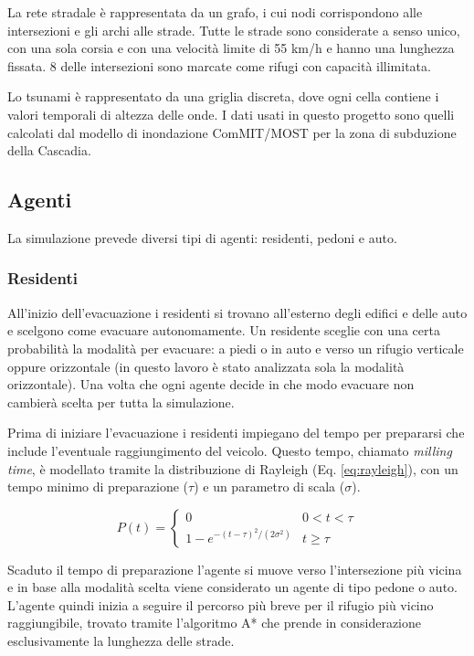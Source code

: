 La rete stradale è rappresentata da un grafo, i cui nodi corrispondono alle intersezioni e gli archi alle strade.
Tutte le strade sono considerate a senso unico, con una sola corsia e con una velocità limite di 55 km/h e hanno una lunghezza fissata.
8 delle intersezioni sono marcate come rifugi con capacità illimitata.

Lo tsunami è rappresentato da una griglia discreta, dove ogni cella contiene i valori temporali di altezza delle onde.
I dati usati in questo progetto sono quelli calcolati dal modello di inondazione ComMIT/MOST \parencite{titov1997implementation} per la zona di subduzione della Cascadia.

\pagebreak

\subsection{Agenti}
La simulazione prevede diversi tipi di agenti: residenti, pedoni e auto.

\subsubsection{Residenti}
All'inizio dell'evacuazione i residenti si trovano all'esterno degli edifici e delle auto
e scelgono come evacuare autonomamente.
Un residente sceglie con una certa probabilità la modalità per evacuare: a piedi o in auto e verso un rifugio verticale oppure orizzontale 
(in questo lavoro è stato analizzata sola la modalità orizzontale). 
Una volta che ogni agente decide in che modo evacuare non cambierà scelta per tutta la simulazione.

Prima di iniziare l'evacuazione i residenti impiegano del tempo per prepararsi
che include l'eventuale raggiungimento del veicolo.
%
Questo tempo, chiamato \textit{milling time}, è modellato tramite
la distribuzione di Rayleigh (Eq. \ref{eq:rayleigh}), con un tempo minimo di preparazione ($\tau$) e un parametro di scala ($\sigma$).

\begin{equation}
  P(t) = 
  \begin{cases}
    0 &0 < t < \tau\\
    1 - e^{-{(t - \tau)^2}/(2\sigma^2)} &t \geq \tau
  \end{cases}
  \label{eq:rayleigh}
\end{equation}

Scaduto il tempo di preparazione l'agente si muove verso l'intersezione più vicina e
in base alla modalità scelta viene considerato un agente di tipo pedone o auto.
L'agente quindi inizia a seguire il percorso più breve per il rifugio più vicino raggiungibile, trovato tramite l'algoritmo A* 
che prende in considerazione esclusivamente la lunghezza delle strade.

